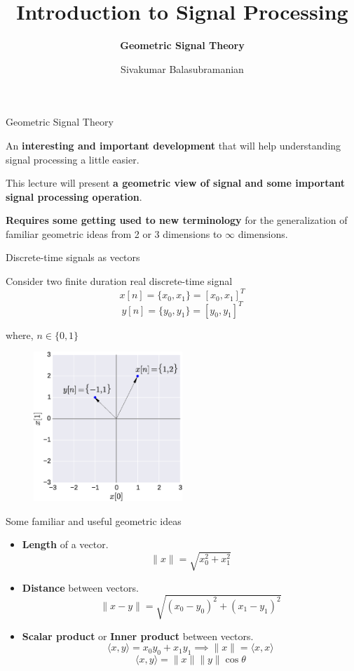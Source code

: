\documentclass{beamer}
\title{Introduction to Signal Processing}
\subtitle{\textbf{Geometric Signal Theory}}
\author{Sivakumar Balasubramanian}
\institute[Christian Medical College] %
{
  \inst{}%
  Department of Bioengineering\\
  Christian Medical College, Bagayam\\
  Vellore 632002
}
\date{}
\begin{document}
\begin{frame}
  \titlepage
\end{frame}

\begin{frame}{Geometric Signal Theory}

An \textbf{interesting and important development} that will help understanding signal processing a little easier.

\vspace{4mm}

This lecture will present \textbf{a geometric view of signal and some important signal processing operation}.

\vspace{4mm}

\textbf{Requires some getting used to new terminology} for the generalization of familiar geometric ideas from 2 or 3 dimensions to $\infty$ dimensions.

\end{frame}

\begin{frame}{Discrete-time signals as vectors}

Consider two finite duration real discrete-time signal 
\[ x[n] = \{\boxed{x_0}, x_1\} = \left[x_0, x_1\right]^{T} \]
\[ y[n] = \{\boxed{y_0}, y_1\} = \left[y_0, y_1\right]^{T} \]

where, $n \in \{0, 1\}$

\begin{figure}
\includegraphics[width=0.5\textwidth]{img/2dvec.eps}
\end{figure}
\end{frame}

\begin{frame}{Some familiar and useful geometric ideas}

\begin{itemize}
\item \textbf{Length} of a vector.
\[ \|x\| = \sqrt{x_0^2 + x_1^2} \]
\item \textbf{Distance} between vectors.
\[ \|x - y\| = \sqrt{\left(x_0 - y_0\right)^2 + \left(x_1 - y_1\right)^2} \]
\item \textbf{Scalar product} or \textbf{Inner product} between vectors.
\[ \langle x, y \rangle = x_0y_0 + x_1y_1 \implies \|x\| = \langle x, x \rangle \]
\[ \langle x, y \rangle = \|x\| \|y\| \cos \theta \]
\end{itemize}
\end{frame}
\end{document}

